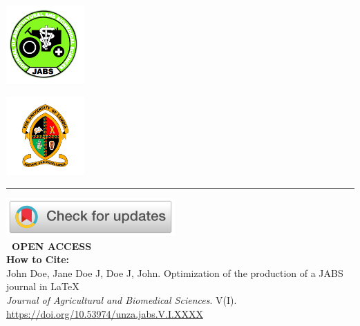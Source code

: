 \vspace*{-1in}
\pagestyle{titlepagestyle}

\noindent
\begin{minipage}{\textwidth}

  \noindent
  \begin{minipage}[c]{0.25\textwidth}
    \includegraphics[width=\linewidth,height=3cm,keepaspectratio]{images/logo-left.png}
  \end{minipage}%
  \hfill
  \begin{minipage}[c]{0.5\textwidth}
    \centering
    \textit{}
  \end{minipage}%
  \hfill
  \begin{minipage}[c]{0.25\textwidth}
    \raggedleft
    \includegraphics[width=\linewidth,height=3cm,keepaspectratio]{images/logo-right.png}
  \end{minipage}

  \vspace{0.5em}
  {\color{jabsgreen}\rule{\textwidth}{2pt}}
  \vspace{1em}

  \noindent
  \begin{minipage}[t]{0.35\textwidth}
    \begin{leftinfobox}
      \small
      \href{https://crossmark.crossref.org/dialog/?doi=10.53974/unza.jabs.V.I.XXXX&domain=pdf}{\includegraphics[width=0.9\linewidth]{images/check_for_updates.png}}\\[0.5em]
      \faUnlock \textbf{~OPEN ACCESS} \\[0.75em]
      \textbf{How to Cite:} \\
      John Doe, Jane Doe J, Doe J, John. Optimization of the production of a JABS journal in LaTeX \\
      \textit{Journal of Agricultural and Biomedical Sciences}. V(I). \\
      \url{https://doi.org/10.53974/unza.jabs.V.I.XXXX} \\[1em]


\end{leftinfobox}
\end{minipage}
\end{minipage}
